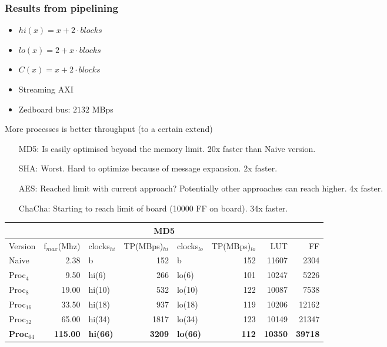 \begin{frame}
  \frametitle{Results from pipelining}
  \fontsize{4pt}{6}\selectfont
\begin{minipage}[b]{0.3\textwidth}
  \begin{tiny}
  \begin{itemize}
  \item $hi(x) = x+2 \cdot blocks$
  \item $lo(x) = 2 + x \cdot blocks$
  \item $C(x) = x + 2 \cdot blocks$
  \item Streaming AXI
    \item Zedboard bus: $2132$ MBps
  \end{itemize}
  More processes is better throughput (to a certain extend)
  \begin{itemize}
    \item[MD5:] Is easily optimised beyond the memory limit. 20x faster than Naive version.
    \item[SHA:] Worst. Hard to optimize because of message expansion. 2x faster.
    \item[AES:] Reached limit with current approach? Potentially other approaches can reach higher. 4x faster.
    \item[ChaCha:] Starting to reach limit of board (10000 FF on board). 34x faster.
  \end{itemize}
  \end{tiny}
\end{minipage}
\qquad
\begin{minipage}[b]{0.65\textwidth}
\begin{tabular}{l r l r l r r r}
\multicolumn{8}{c}{MD5}\\
\hline
Version & f$_{max}$(Mhz) & clocks$_{hi}$ & TP(MBps)$_{hi}$ &clocks$_{lo}$ & TP(MBps)$_{lo}$ & LUT & FF\\
\hline
Naive     & 2.38   & b      &   152& b     &  152 & 11607 & 2304\\
Proc$_{4}$ & 9.50   & hi(6)  &  266& lo(6) & 101 & 10247 & 5226\\
Proc$_{8}$ & 19.00  & hi(10) &  532& lo(10)& 122 & 10087 & 7538\\
Proc$_{16}$ & 33.50  & hi(18) & 937& lo(18)&119 & 10206 & 12162\\
Proc$_{32}$ & 65.00  & hi(34) & 1817& lo(34)&123 & 10149 & 21347\\
\textbf{Proc}$_{64}$ & \textbf{115.00} & \textbf{hi(66)} & \textbf{3209}& \textbf{lo(66)} &\textbf{112} & \textbf{10350} & \textbf{39718}\\

\end{tabular}
\end{minipage}
\end{frame}
